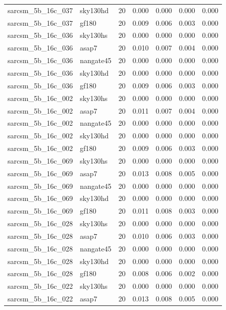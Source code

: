 \begin{tabular}{llrrrrr}
sarcsm\_5b\_16c\_037 & sky130hd & 20 & 0.000 & 0.000 & 0.000 & 0.000 \\
sarcsm\_5b\_16c\_037 & gf180 & 20 & 0.009 & 0.006 & 0.003 & 0.000 \\
sarcsm\_5b\_16c\_036 & sky130hs & 20 & 0.000 & 0.000 & 0.000 & 0.000 \\
sarcsm\_5b\_16c\_036 & asap7 & 20 & 0.010 & 0.007 & 0.004 & 0.000 \\
sarcsm\_5b\_16c\_036 & nangate45 & 20 & 0.000 & 0.000 & 0.000 & 0.000 \\
sarcsm\_5b\_16c\_036 & sky130hd & 20 & 0.000 & 0.000 & 0.000 & 0.000 \\
sarcsm\_5b\_16c\_036 & gf180 & 20 & 0.009 & 0.006 & 0.003 & 0.000 \\
sarcsm\_5b\_16c\_002 & sky130hs & 20 & 0.000 & 0.000 & 0.000 & 0.000 \\
sarcsm\_5b\_16c\_002 & asap7 & 20 & 0.011 & 0.007 & 0.004 & 0.000 \\
sarcsm\_5b\_16c\_002 & nangate45 & 20 & 0.000 & 0.000 & 0.000 & 0.000 \\
sarcsm\_5b\_16c\_002 & sky130hd & 20 & 0.000 & 0.000 & 0.000 & 0.000 \\
sarcsm\_5b\_16c\_002 & gf180 & 20 & 0.009 & 0.006 & 0.003 & 0.000 \\
sarcsm\_5b\_16c\_069 & sky130hs & 20 & 0.000 & 0.000 & 0.000 & 0.000 \\
sarcsm\_5b\_16c\_069 & asap7 & 20 & 0.013 & 0.008 & 0.005 & 0.000 \\
sarcsm\_5b\_16c\_069 & nangate45 & 20 & 0.000 & 0.000 & 0.000 & 0.000 \\
sarcsm\_5b\_16c\_069 & sky130hd & 20 & 0.000 & 0.000 & 0.000 & 0.000 \\
sarcsm\_5b\_16c\_069 & gf180 & 20 & 0.011 & 0.008 & 0.003 & 0.000 \\
sarcsm\_5b\_16c\_028 & sky130hs & 20 & 0.000 & 0.000 & 0.000 & 0.000 \\
sarcsm\_5b\_16c\_028 & asap7 & 20 & 0.010 & 0.006 & 0.003 & 0.000 \\
sarcsm\_5b\_16c\_028 & nangate45 & 20 & 0.000 & 0.000 & 0.000 & 0.000 \\
sarcsm\_5b\_16c\_028 & sky130hd & 20 & 0.000 & 0.000 & 0.000 & 0.000 \\
sarcsm\_5b\_16c\_028 & gf180 & 20 & 0.008 & 0.006 & 0.002 & 0.000 \\
sarcsm\_5b\_16c\_022 & sky130hs & 20 & 0.000 & 0.000 & 0.000 & 0.000 \\
sarcsm\_5b\_16c\_022 & asap7 & 20 & 0.013 & 0.008 & 0.005 & 0.000 \\

\end{tabular}

